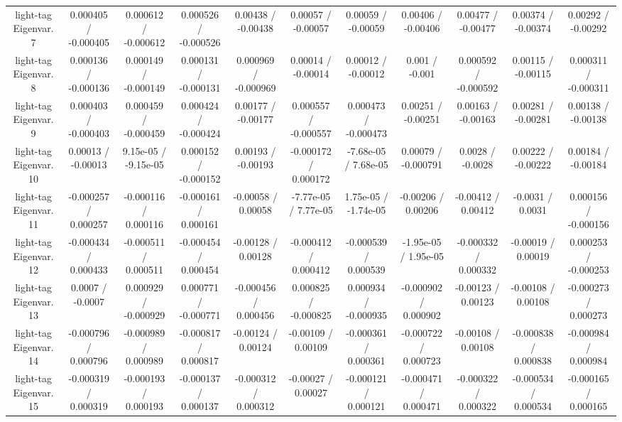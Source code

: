 \begin{table}[htbp]
\begin{center}
\begin{tabular}{|c|c|c|c|c|c|c|c|c|c|c|}
  light-tag Eigenvar. 7 & 0.000405 / -0.000405 & 0.000612 / -0.000612 & 0.000526 / -0.000526 & 0.00438 / -0.00438 & 0.00057 / -0.00057 & 0.00059 / -0.00059 & 0.00406 / -0.00406 & 0.00477 / -0.00477 & 0.00374 / -0.00374 & 0.00292 / -0.00292 \\ 
  light-tag Eigenvar. 8 & 0.000136 / -0.000136 & 0.000149 / -0.000149 & 0.000131 / -0.000131 & 0.000969 / -0.000969 & 0.00014 / -0.00014 & 0.00012 / -0.00012 & 0.001 / -0.001 & 0.000592 / -0.000592 & 0.00115 / -0.00115 & 0.000311 / -0.000311 \\ 
  light-tag Eigenvar. 9 & 0.000403 / -0.000403 & 0.000459 / -0.000459 & 0.000424 / -0.000424 & 0.00177 / -0.00177 & 0.000557 / -0.000557 & 0.000473 / -0.000473 & 0.00251 / -0.00251 & 0.00163 / -0.00163 & 0.00281 / -0.00281 & 0.00138 / -0.00138 \\ 
  light-tag Eigenvar. 10 & 0.00013 / -0.00013 & 9.15e-05 / -9.15e-05 & 0.000152 / -0.000152 & 0.00193 / -0.00193 & -0.000172 / 0.000172 & -7.68e-05 / 7.68e-05 & 0.00079 / -0.000791 & 0.0028 / -0.0028 & 0.00222 / -0.00222 & 0.00184 / -0.00184 \\ 
  light-tag Eigenvar. 11 & -0.000257 / 0.000257 & -0.000116 / 0.000116 & -0.000161 / 0.000161 & -0.00058 / 0.00058 & -7.77e-05 / 7.77e-05 & 1.75e-05 / -1.74e-05 & -0.00206 / 0.00206 & -0.00412 / 0.00412 & -0.0031 / 0.0031 & 0.000156 / -0.000156 \\ 
  light-tag Eigenvar. 12 & -0.000434 / 0.000433 & -0.000511 / 0.000511 & -0.000454 / 0.000454 & -0.00128 / 0.00128 & -0.000412 / 0.000412 & -0.000539 / 0.000539 & -1.95e-05 / 1.95e-05 & -0.000332 / 0.000332 & -0.00019 / 0.00019 & 0.000253 / -0.000253 \\ 
  light-tag Eigenvar. 13 & 0.0007 / -0.0007 & 0.000929 / -0.000929 & 0.000771 / -0.000771 & -0.000456 / 0.000456 & 0.000825 / -0.000825 & 0.000934 / -0.000935 & -0.000902 / 0.000902 & -0.00123 / 0.00123 & -0.00108 / 0.00108 & -0.000273 / 0.000273 \\ 
  light-tag Eigenvar. 14 & -0.000796 / 0.000796 & -0.000989 / 0.000989 & -0.000817 / 0.000817 & -0.00124 / 0.00124 & -0.00109 / 0.00109 & -0.000361 / 0.000361 & -0.000722 / 0.000723 & -0.00108 / 0.00108 & -0.000838 / 0.000838 & -0.000984 / 0.000984 \\ 
  light-tag Eigenvar. 15 & -0.000319 / 0.000319 & -0.000193 / 0.000193 & -0.000137 / 0.000137 & -0.000312 / 0.000312 & -0.00027 / 0.00027 & -0.000121 / 0.000121 & -0.000471 / 0.000471 & -0.000322 / 0.000322 & -0.000534 / 0.000534 & -0.000165 / 0.000165 \\ 

\end{tabular}
\end{center}
\end{table}
